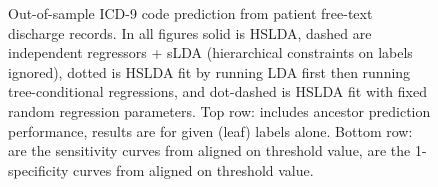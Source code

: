 \documentclass{article}
\begin{document}
\begin{figure}[htbp]
\begin{center}
\caption{Out-of-sample ICD-9 code prediction from patient free-text discharge records.  In all figures solid is HSLDA, dashed are independent regressors + sLDA (hierarchical constraints on labels ignored), dotted is HSLDA fit by running LDA first then running tree-conditional regressions, and dot-dashed is HSLDA fit with fixed random regression parameters.  Top row:   includes ancestor prediction performance,   results are for given (leaf) labels alone.  Bottom row:  are the sensitivity curves from  aligned on threshold value,   are the 1-specificity curves from  aligned on threshold value.}
\label{fig:icd9}
\end{center}
\end{figure}

\begin{figure}[htbp]
\begin{center}

\end{center}
\end{figure}
\end{document}
